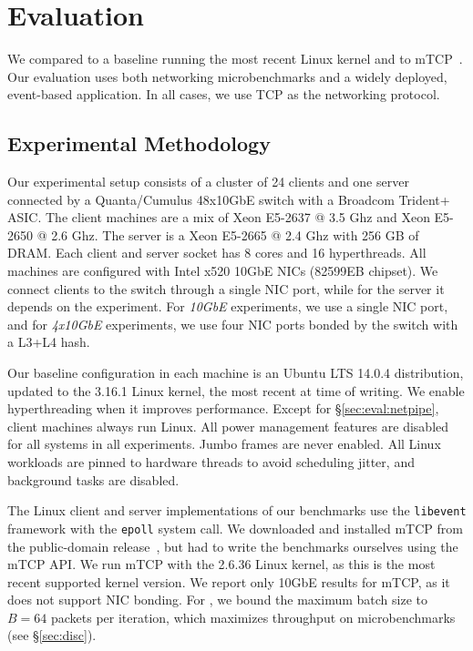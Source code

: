 
\section{Evaluation}
\label{sec:eval}


We compared \ix to a baseline running the most recent Linux kernel and
to mTCP~\cite{jeong2014mtcp}. Our evaluation uses both networking
microbenchmarks and a widely deployed, event-based application. In all
cases, we use TCP as the networking protocol.

\subsection{Experimental Methodology}
\label{sec:eval:setup}



Our experimental setup consists of a cluster of 24 clients and one
server connected by a Quanta/Cumulus 48x10GbE switch with a Broadcom
Trident+ ASIC.  The client machines are a mix of Xeon E5-2637 @ 3.5
Ghz and Xeon E5-2650 @ 2.6 Ghz. The server is a Xeon E5-2665 @ 2.4 Ghz
with 256 GB of DRAM.  Each client and server socket has 8 cores and 16
hyperthreads. All machines are configured with Intel x520 10GbE NICs
(82599EB chipset). We connect clients to the switch through a single
NIC port, while for the server it depends on the experiment. For
\emph{10GbE} experiments, we use a single NIC port, and for
\emph{4x10GbE} experiments, we use four NIC ports bonded by the switch
with a L3+L4 hash.

Our baseline configuration in each
machine is an Ubuntu LTS 14.0.4 distribution, updated to the 3.16.1 Linux kernel, the most
recent at time of writing.
We enable hyperthreading when it improves performance. Except for
\S\ref{sec:eval:netpipe}, client machines always run Linux. All power
management features are disabled for all systems in all
experiments. Jumbo frames are never enabled. All Linux workloads
are pinned to hardware threads to avoid scheduling jitter, and
background tasks are disabled.

 

The Linux client and server implementations of our benchmarks use the
\texttt{libevent} framework with the \texttt{epoll} system call.  We
downloaded and installed mTCP from the public-domain
release~\cite{url:mtcp}, but had to write the benchmarks ourselves
using the mTCP API.  We run mTCP with the 2.6.36 Linux kernel, as this
is the most recent supported kernel version.  We report only 10GbE
results for mTCP, as it does not support NIC bonding. For \ix, we
bound the maximum batch size to $B=64$ packets per iteration, which maximizes throughput on microbenchmarks (see
\S\ref{sec:disc}).



